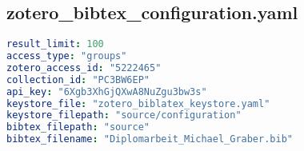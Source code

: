 
\subsection{zotero\_bibtex\_configuration.yaml}
\lstset{style=gra_codestyle}
\begin{lstlisting}[language=yaml, caption=Python LaTex - zotero\_bibtex\_configuration.yaml - Konfigurationsdatei - Zotero BibLaTex Importer,captionpos=b,label={lst:zotero_bibtex_configuration},breaklines=true]
result_limit: 100
access_type: "groups"
zotero_access_id: "5222465"
collection_id: "PC3BW6EP"
api_key: "6Xgb3XhGjQXwA8NuZgu3bw3s"
keystore_file: "zotero_biblatex_keystore.yaml"
keystore_filepath: "source/configuration"
bibtex_filepath: "source"
bibtex_filename: "Diplomarbeit_Michael_Graber.bib"
\end{lstlisting}